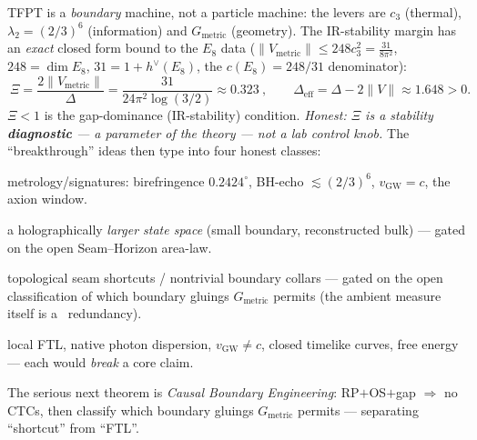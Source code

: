 \documentclass[11pt,a4paper]{article}
\newcommand{\cthree}{c_3}
\begin{document}
\begin{keybox}
TFPT is a \emph{boundary} machine, not a particle machine: the levers are $\cthree$ (thermal),
$\lambda_2{=}(2/3)^6$ (information) and $G_{\mathrm{metric}}$ (geometry). The IR-stability margin has an
\emph{exact} closed form bound to the $E_8$ data ($\|V_{\mathrm{metric}}\|\le248\cthree^2=\tfrac{31}{8\pi^2}$,
$248{=}\dim E_8$, $31{=}1{+}h^\vee(E_8)$, the $c(E_8){=}248/31$ denominator):
\[
  \boxed{\ \Xi=\frac{2\|V_{\mathrm{metric}}\|}{\Delta}=\frac{31}{24\pi^2\log(3/2)}\approx0.323\ },\qquad
  \Delta_{\mathrm{eff}}=\Delta-2\|V\|\approx1.648>0 .
\]
$\Xi<1$ is the gap-dominance (IR-stability) condition. \emph{Honest: $\Xi$ is a stability
\textbf{diagnostic} --- a parameter of the theory --- not a lab control knob.} The ``breakthrough'' ideas
then type into four honest classes:
\begin{description}[leftmargin=2.0em,style=nextline,itemsep=1pt]
\item[\textnormal{A --- allowed \& near \mE.}] metrology/signatures: birefringence $0.2424^\circ$, BH-echo $\lesssim(2/3)^6$, $v_{\mathrm{GW}}{=}c$, the axion window.
\item[\textnormal{B --- allowed as reconstruction \mO.}] a holographically \emph{larger state space} (small boundary, reconstructed bulk) --- gated on the open Seam--Horizon area-law.
\item[\textnormal{C --- only after Causal Boundary Engineering \mO.}] topological seam shortcuts / nontrivial boundary collars --- gated on the open classification of which boundary gluings $G_{\mathrm{metric}}$ permits (the ambient measure itself is a \mC\ redundancy).
\item[\textnormal{D --- currently forbidden.}] local FTL, native photon dispersion, $v_{\mathrm{GW}}{\neq}c$, closed timelike curves, free energy --- each would \emph{break} a core claim.
\end{description}
The serious next theorem is \emph{Causal Boundary Engineering}: RP$+$OS$+$gap $\Rightarrow$ no CTCs, then
classify which boundary gluings $G_{\mathrm{metric}}$ permits --- separating ``shortcut'' from ``FTL''.
\end{keybox}
\end{document}
